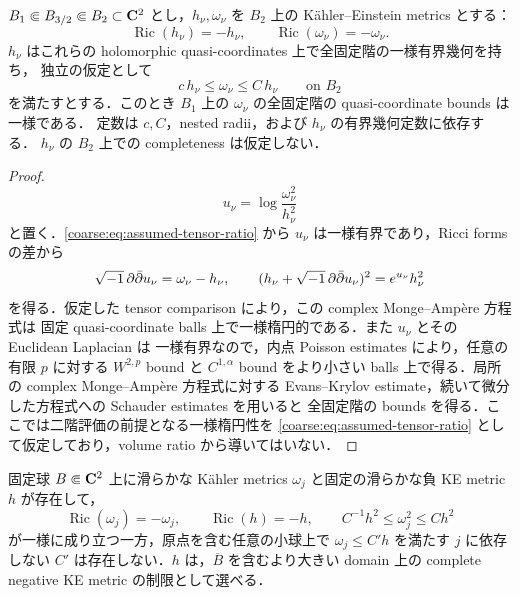 \documentclass[a4paper,11pt]{ltjsarticle}
\numberwithin{equation}{section}
\theoremstyle{plain}
\theoremstyle{definition}
\theoremstyle{remark}
\newcommand{\Ric}{\operatorname{Ric}}\newcommand{\tr}{\operatorname{tr}}\newcommand{\osc}{\operatorname{osc}}\newcommand{\vol}{\operatorname{Vol}}
\begin{document}
\begin{lemma}\label{coarse:lem:nested-metric}
$B_1\Subset B_{3/2}\Subset B_2\subset\mathbf C^2$ とし，$h_\nu,\omega_\nu$ を $B_2$ 上の
K\"ahler--Einstein metrics とする：
\[
 \Ric(h_\nu)=-h_\nu,\qquad \Ric(\omega_\nu)=-\omega_\nu.
\]
$h_\nu$ はこれらの holomorphic quasi-coordinates 上で全固定階の一様有界幾何を持ち，
独立の仮定として
\begin{equation}\label{coarse:eq:assumed-tensor-ratio}
 c\,h_\nu\le\omega_\nu\le C\,h_\nu
 \qquad\text{on }B_2
\end{equation}
を満たすとする．このとき $B_1$ 上の $\omega_\nu$ の全固定階の quasi-coordinate bounds は一様である．
定数は $c,C$，nested radii，および $h_\nu$ の有界幾何定数に依存する．
$h_\nu$ の $B_2$ 上での completeness は仮定しない．
\end{lemma}

\begin{proof}
\[
 u_\nu=\log\frac{\omega_\nu^2}{h_\nu^2}
\]
と置く．\eqref{coarse:eq:assumed-tensor-ratio} から $u_\nu$ は一様有界であり，Ricci forms の差から
\begin{equation}\label{coarse:eq:local-potential-identity}
 \sqrt{-1}\,\partial\bar\partial u_\nu=\omega_\nu-h_\nu,
 \qquad
 (h_\nu+\sqrt{-1}\,\partial\bar\partial u_\nu)^2=e^{u_\nu}h_\nu^2
\end{equation}
を得る．仮定した tensor comparison により，この complex Monge--Amp\`ere 方程式は
固定 quasi-coordinate balls 上で一様楕円的である．また $u_\nu$ とその Euclidean Laplacian は
一様有界なので，内点 Poisson estimates により，任意の有限 $p$ に対する $W^{2,p}$ bound と
$C^{1,\alpha}$ bound をより小さい balls 上で得る．局所の complex Monge--Amp\`ere 方程式に対する
Evans--Krylov estimate，続いて微分した方程式への Schauder estimates を用いると
全固定階の bounds を得る．ここでは二階評価の前提となる一様楕円性を
\eqref{coarse:eq:assumed-tensor-ratio} として仮定しており，volume ratio から導いてはいない．
\end{proof}

\begin{proposition}\label{coarse:prop:density-counterexample}
固定球 $B\Subset\mathbf C^2$ 上に滑らかな K\"ahler metrics $\omega_j$ と固定の滑らかな負 KE metric $h$ が存在して，
\[
 \Ric(\omega_j)=-\omega_j,\qquad \Ric(h)=-h,\qquad
 C^{-1}h^2\le\omega_j^2\le Ch^2
\]
が一様に成り立つ一方，原点を含む任意の小球上で $\omega_j\le C' h$ を満たす
$j$ に依存しない $C'$ は存在しない．$h$ は，$\overline B$ を含むより大きい domain 上の
complete negative KE metric の制限として選べる．
\end{proposition}
\end{document}
